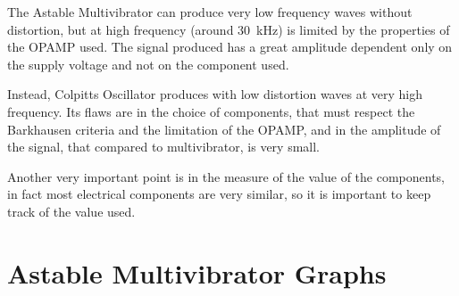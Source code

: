 \documentclass[a4paper, twocolumn]{article}
\begin{document}
The Astable Multivibrator can produce very low frequency waves without distortion, but at high frequency (around \SI{30}{\kilo\hertz}) is limited by the properties of the OPAMP used. The signal produced has a great amplitude dependent only on the supply voltage and not on the component used. 

Instead, Colpitts Oscillator produces with low distortion waves at very high frequency. Its flaws are in the choice of components, that must respect the Barkhausen criteria and the limitation of the OPAMP, and in the amplitude of the signal, that compared to multivibrator, is very small.

Another very important point is in the measure of the value of the components, in fact most electrical components are very similar, so it is important to keep track of the value used. 

\appendix
\onecolumn

\section{Astable Multivibrator Graphs}
\label{app:multivib}
\end{document}
